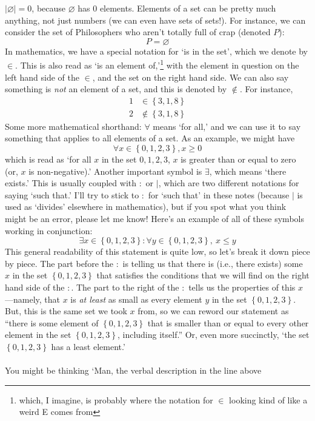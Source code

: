 \documentclass[10pt]{article}
\theoremstyle{definition}
\newcommand{\set}[1]{\left\{ #1 \right\}}
\begin{document}
{{  $|\varnothing| = 0$, because $\varnothing$ has 0 elements.}
Elements of a set can be pretty much anything, not just numbers (we
can even have sets of sets!).  For instance, we can consider the set
of Philosophers who aren't totally full of crap (denoted $P$):
\[P = \varnothing\]
In mathematics, we have a special notation for `is in the set', which
we denote by $\in$.  This is also read as `is an element
of,'\footnote{which, I imagine, is probably where the notation for
  $\in$ looking kind of like a weird E comes from} with the element in
question on the left hand side of the $\in$, and the set on the right
hand side.  We can also say something is \emph{not} an element of a
set, and this is denoted by $\notin$.  For instance,
\begin{align*}
1&\in\set{3,1,8}\\
2&\notin\set{3,1,8}
\end{align*}
Some more mathematical shorthand: $\forall$ means `for all,' and we
can use it to say something that applies to all elements of a set.  As
an example, we might have
\[\forall x\in \set{0,1,2,3}, x\geq 0\]
which is read as `for all $x$ in the set ${0,1,2,3}$, $x$ is greater
than or equal to zero (or, $x$ is non-negative).'  Another important
symbol is $\exists$, which means `there exists.'  This is usually
coupled with $:$ or $|$, which are two different notations for saying
`such that.'  I'll try to stick to $:$ for `such that' in these notes
(because $|$ is used as `divides' elsewhere in mathematics), but if
you spot what you think might be an error, please let me know!  Here's
an example of all of these symbols working in conjunction:
\[\exists x\in \set{0,1,2,3} : \forall y\in\set{0,1,2,3},~x\leq y\]
This general readability of this statement is quite low, so let's
break it down piece by piece.  The part before the $:$ is telling us
that there is (i.e., there exists) some $x$ in the set $\set{0,1,2,3}$
that satisfies the conditions that we will find on the right hand side
of the $:$.  The part to the right of the $:$ tells us the properties
of this $x$---namely, that $x$ is \emph{at least} as small as every
element $y$ in the set $\set{0,1,2,3}$.  But, this is the same set we
took $x$ from, so we can reword our statement as ``there is some
element of $\set{0,1,2,3}$ that is smaller than or equal to every
other element in the set $\set{0,1,2,3}$, including itself.''  Or,
even more succinctly, `the set $\set{0,1,2,3}$ has a least element.'
\\~\\
You might be thinking `Man, the verbal description in the line above
}
\end{document}
